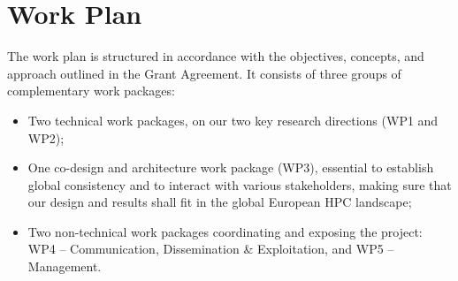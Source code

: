 \documentclass[a4paper,12pt]{article}
\begin{document}

\newpage

\section{\textcolor{EUblue}{Work Plan}}
\label{sec:work_plan}
The work plan is structured in accordance with the objectives, concepts, and approach outlined in the Grant Agreement. It consists of three groups of complementary work packages:
\begin{itemize}[left=1em, itemsep=0pt, topsep=0pt] 
    \item Two technical work packages, on our two key research directions (WP1 and WP2);
    \item  One co-design and architecture work package (WP3), essential to establish global consistency and to interact with various stakeholders, making sure that our design and results shall fit in the global European HPC landscape;
    \item Two non-technical work packages coordinating and exposing the project: WP4 -- Communication, Dissemination \& Exploitation, and WP5 -- Management.
\end{itemize}
%
\end{document}
